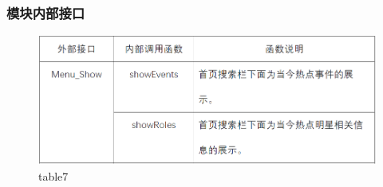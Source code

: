 \subsubsection{模块内部接口}
\begin{figure}[!htbp]
	\centering
	\includegraphics[scale=0.7]{image/b7.png} %
	\caption{table7} %
\end{figure}
